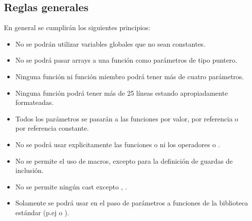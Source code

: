 \subsection{Reglas generales}

En general se cumplirán los siguientes principios:

\begin{itemize}

\item No se podrán utilizar variables globales que no sean constantes.

\item No se podrá pasar arrays a una función como parámetros de tipo puntero.

\item Ninguna función ni función miembro podrá tener más de cuatro parámetros.

\item Ninguna función podrá tener más de 25 líneas estando apropiadamente
formateadas.

\item Todos los parámetros se pasarán a las funciones por valor, por referencia
o por referencia constante.

\item No se podrá usar explicitamente las funciones 
o  ni los operadores  o .

\item No se permite el uso de macros, excepto para la definición de guardas de inclusión.

\item No se permite ningún cast excepto , 
.

\item Solamente se podrá usar  en el paso de parámetros a funciones
de la biblioteca estándar (p.ej  o ).

\end{itemize}
